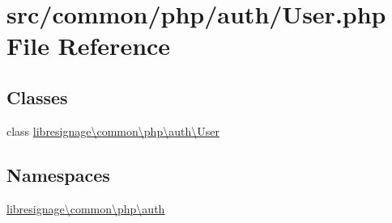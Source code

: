 \hypertarget{User_8php}{}\section{src/common/php/auth/\+User.php File Reference}
\label{User_8php}
\subsection*{Classes}
\begin{DoxyCompactItemize}
\item 
class \hyperlink{classlibresignage_1_1common_1_1php_1_1auth_1_1User}{libresignage\textbackslash{}common\textbackslash{}php\textbackslash{}auth\textbackslash{}\+User}
\end{DoxyCompactItemize}
\subsection*{Namespaces}
\begin{DoxyCompactItemize}
\item 
 \hyperlink{namespacelibresignage_1_1common_1_1php_1_1auth}{libresignage\textbackslash{}common\textbackslash{}php\textbackslash{}auth}
\end{DoxyCompactItemize}
